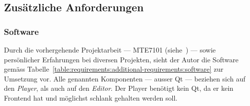 
\subsection{Zusätzliche Anforderungen}
\label{subsec:requirements:additional-requirements}

\subsubsection{Software}
\label{subsec:requirements:additional-requirements:software}

Durch die vorhergehende Projektarbeit --- MTE7101
(siehe~\cite{osterwalder_sven_volume_2016}) --- sowie persönlicher Erfahrungen
bei diversen Projekten, sieht der Autor die Software gemäss
Tabelle~\ref{table:requirements:additional-requirements:software} zur Umsetzung
vor. Alle genannten Komponenten --- ausser Qt --- beziehen sich auf den
\textit{Player}, als auch auf den \textit{Editor}.  Der Player benötigt kein
Qt, da er kein Frontend hat und möglichst schlank gehalten werden soll.

